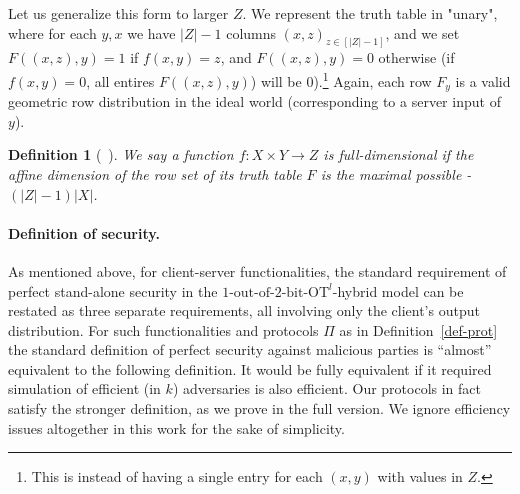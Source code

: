 \documentclass[a4paper]{article}
\newtheorem{definition}{Definition}[section]
\newcommand{\OT}[2]{#1\text{-out-of-}#2\text{-bit-OT}}
\newcommand{\atodo}[1]{\textcolor{purple}{TODO: #1}}
\begin{document}
Let us generalize this form to larger $Z$. We represent the truth table in "unary", where for each $y,x$ we have $|Z|-1$ columns $(x,z)_{z\in [|Z|-1]}$, and we set $F((x,z),y)=1$
if $f(x,y)=z$, and $F((x,z),y)=0$ otherwise (if $f(x,y)=0$, all entires $F((x,z),y)$) will be $0$).\footnote{This is instead of having a single entry for each $(x,y)$ with values in $Z$.}
Again, each row $F_y$ is a valid geometric row distribution in the ideal world (corresponding to a server input of $y$).

\begin{definition}[~\cite{Ash14}]
	We say a function $f:X\times Y\rightarrow Z$ is full-dimensional if the affine dimension of the row set of its truth table $F$ is the maximal possible - $(|Z|-1)|X|$.
\end{definition}

\paragraph{Definition of security.}
As mentioned above, for client-server functionalities, the standard requirement of perfect stand-alone security in the ${\OT{1}{2}}^l$-hybrid model can be restated as three separate requirements, all involving only the client's output distribution.
For such functionalities and protocols $\Pi$ as in Definition~\ref{def-prot} the standard definition of perfect security against malicious parties is ``almost'' equivalent to the following definition.
It would be fully equivalent if it required simulation of efficient (in $k$) adversaries is also efficient. Our protocols in fact satisfy the stronger definition, as we prove in the full version. We ignore efficiency issues altogether in this work for the sake of simplicity. 
\end{document}
